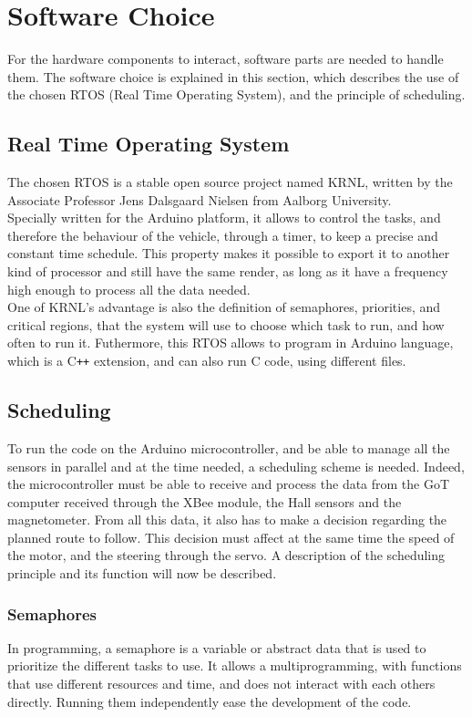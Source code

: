\section{Software Choice}
For the hardware components to interact, software parts are needed to handle them. The software choice is explained in this section, which describes the use of the chosen RTOS (Real Time Operating System), and the principle of scheduling.

\subsection{Real Time Operating System}
The chosen RTOS is a stable open source project named KRNL, written by the Associate Professor Jens Dalsgaard Nielsen from Aalborg University.\\
Specially written for the Arduino platform, it allows to control the tasks, and therefore the behaviour of the vehicle, through a timer, to keep a precise and constant time schedule. This property makes it possible to export it to another kind of processor and still have the same render, as long as it have a frequency high enough to process all the data needed.\\
One of KRNL's advantage is also the definition of semaphores, priorities, and critical regions, that the system will use to choose which task to run, and how often to run it. Futhermore, this RTOS allows to program in Arduino language, which is a C\texttt{++} extension, and can also run C code, using different files.

\subsection{Scheduling}\label{sec:scheduling}
To run the code on the Arduino microcontroller, and be able to manage all the sensors in parallel and at the time needed, a scheduling scheme is needed. Indeed, the microcontroller must be able to receive and process the data from the GoT computer received through the XBee module, the Hall sensors and the magnetometer. From all this data, it also has to make a decision regarding the planned route to follow. This decision must affect at the same time the speed of the motor, and the steering through the servo.
A description of the scheduling principle and its function will now be described.


\subsubsection{Semaphores}
In programming, a semaphore is a variable or abstract data that is used to prioritize the different tasks to use. It allows a multiprogramming, with functions that use different resources and time, and does not interact with each others directly. Running them independently ease the development of the code.

